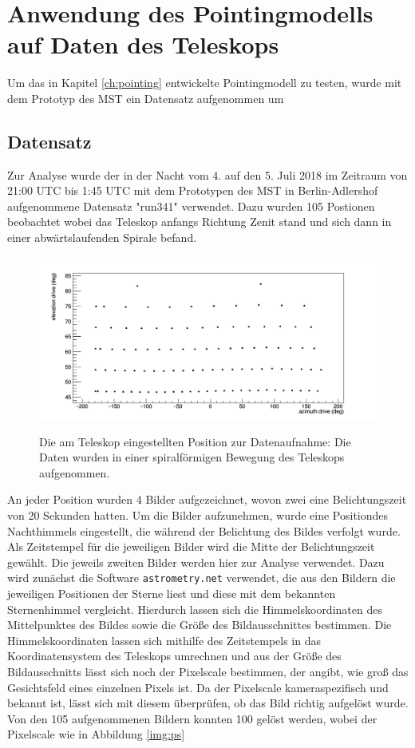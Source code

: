 \chapter{Anwendung des Pointingmodells auf Daten des Teleskops}
\label{ch:auswertung}
Um das in Kapitel \ref{ch:pointing} entwickelte Pointingmodell zu testen, wurde mit dem Prototyp des MST ein Datensatz aufgenommen um
\section{Datensatz}
Zur Analyse wurde der in der Nacht vom 4. auf den 5. Juli 2018 im Zeitraum von 21:00 UTC bis 1:45 UTC mit dem Prototypen des MST in Berlin-Adlershof aufgenommene Datensatz "run341" verwendet. Dazu wurden 105 Postionen beobachtet wobei das Teleskop anfangs Richtung Zenit stand und sich dann in einer abwärtslaufenden Spirale befand.
\begin{figure}[htbp]
\centering
\includegraphics[width=\textwidth]{../341/data4.png}
\label{img:record}
\caption{Die am Teleskop eingestellten Position zur Datenaufnahme: Die Daten wurden in einer spiralförmigen Bewegung des Teleskops aufgenommen.}
\end{figure}
An jeder Position wurden 4 Bilder aufgezeichnet, wovon zwei eine Belichtungszeit von 20 Sekunden hatten.
Um die Bilder aufzunehmen, wurde eine Positiondes Nachthimmels eingestellt, die während der Belichtung des Bildes verfolgt wurde. Als Zeitstempel für die jeweiligen Bilder wird die Mitte der Belichtungszeit gewählt. Die jeweils zweiten Bilder werden hier zur Analyse verwendet. Dazu wird zunächst die Software \texttt{astrometry.net} verwendet, die aus den Bildern die jeweiligen Positionen der Sterne liest und diese mit dem bekannten Sternenhimmel vergleicht. Hierdurch lassen sich die Himmelskoordinaten des Mittelpunktes des Bildes sowie die Größe des Bildausschnittes bestimmen.
Die Himmelskoordinaten lassen sich mithilfe des Zeitstempels in das Koordinatensystem des Teleskops umrechnen und aus der Größe des Bildausschnitts lässt sich noch der Pixelscale bestimmen, der angibt, wie groß das Gesichtsfeld eines einzelnen Pixels ist. Da der Pixelscale kameraspezifisch und bekannt ist, lässt sich mit diesem überprüfen, ob das Bild richtig aufgelöst wurde. Von den 105 aufgenommenen Bildern konnten 100 gelöst werden, wobei der Pixelscale wie in Abbildung \ref{img:ps}
